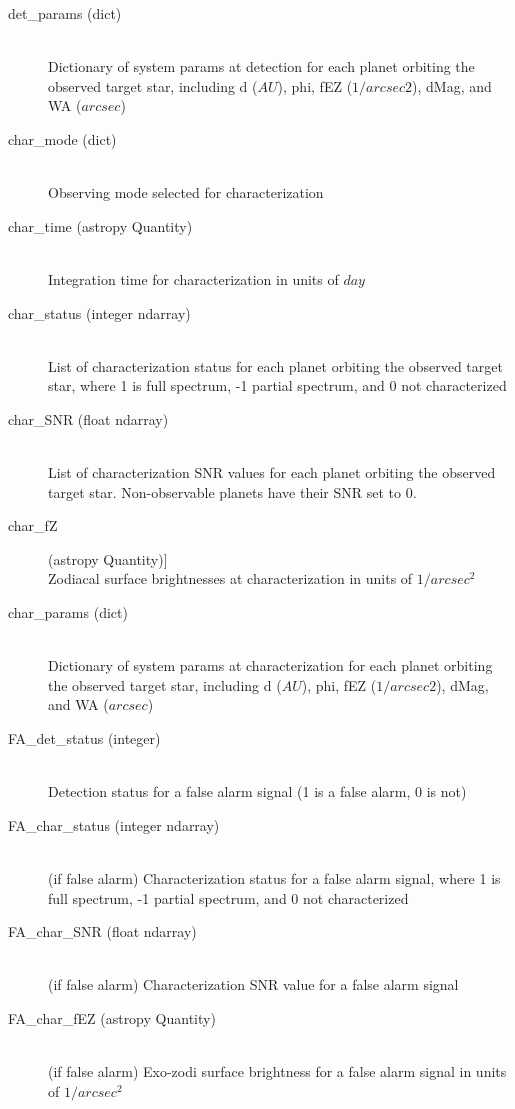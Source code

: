 \documentclass[cleanfoot]{asme2ej}
\begin{document}
\begin{itemize}
\begin{description}
\begin{description}
        \item[det\_params (dict)] \hfill \\ Dictionary of system params at detection for each planet orbiting the observed target star, including d ($AU$), phi, fEZ ($1/arcsec2$), dMag, and WA ($arcsec$)
        \item[char\_mode (dict)] \hfill \\ Observing mode selected for characterization
        \item[char\_time (astropy Quantity)] \hfill \\ Integration time for characterization in units of $ day $
        \item[char\_status (integer ndarray)] \hfill \\ List of characterization status for each planet orbiting the observed target star, where 1 is full spectrum, -1 partial spectrum, and 0 not characterized
        \item[char\_SNR (float ndarray)] \hfill \\ List of characterization SNR values for each planet orbiting the observed target star. Non-observable planets have their SNR set to 0.
        \item[char\_fZ] (astropy Quantity)] \hfill \\ Zodiacal surface brightnesses at characterization in units of $1/arcsec^2$
        \item[char\_params (dict)] \hfill \\ Dictionary of system params at characterization for each planet orbiting the observed target star, including d ($AU$), phi, fEZ ($1/arcsec2$), dMag, and WA ($arcsec$)
        \item[FA\_det\_status (integer)] \hfill \\ Detection status for a false alarm signal (1 is a false alarm, 0 is not)
        \item[FA\_char\_status (integer ndarray)] \hfill \\ (if false alarm) Characterization status for a false alarm signal, where 1 is full spectrum, -1 partial spectrum, and 0 not characterized
        \item[FA\_char\_SNR (float ndarray)] \hfill \\ (if false alarm) Characterization SNR value for a false alarm signal
        \item[FA\_char\_fEZ (astropy Quantity)] \hfill \\ (if false alarm) Exo-zodi surface brightness for a false alarm signal in units of $1/arcsec^2$

\end{description}
\end{description}
\end{itemize}
\end{document}
